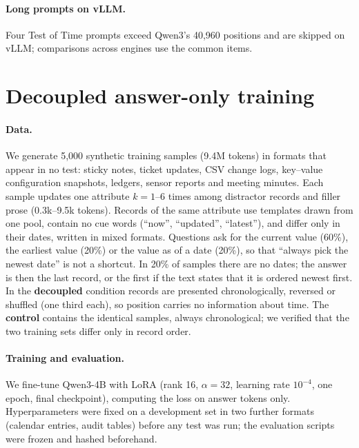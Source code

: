 \documentclass[11pt]{article}
\begin{document}
\paragraph{Long prompts on vLLM.} Four Test of Time prompts exceed Qwen3's 40{,}960 positions and are skipped on vLLM; comparisons across engines use the common items.

\section{Decoupled answer-only training}
\label{app:selection}

\paragraph{Data.}
We generate 5{,}000 synthetic training samples (9.4M tokens) in formats that appear in no test: sticky notes, ticket updates, CSV change logs, key--value configuration snapshots, ledgers, sensor reports and meeting minutes.
Each sample updates one attribute $k=1$--$6$ times among distractor records and filler prose (0.3k--9.5k tokens).
Records of the same attribute use templates drawn from one pool, contain no cue words (``now'', ``updated'', ``latest''), and differ only in their dates, written in mixed formats.
Questions ask for the current value (60\%), the earliest value (20\%) or the value as of a date (20\%), so that ``always pick the newest date'' is not a shortcut. In 20\% of samples there are no dates; the answer is then the last record, or the first if the text states that it is ordered newest first.
In the \textbf{decoupled} condition records are presented chronologically, reversed or shuffled (one third each), so position carries no information about time. The \textbf{control} contains the identical samples, always chronological; we verified that the two training sets differ only in record order.

\paragraph{Training and evaluation.}
We fine-tune Qwen3-4B with LoRA \citep{hu2022lora} (rank 16, $\alpha=32$, learning rate $10^{-4}$, one epoch, final checkpoint), computing the loss on answer tokens only.
Hyperparameters were fixed on a development set in two further formats (calendar entries, audit tables) before any test was run; the evaluation scripts were frozen and hashed beforehand.
\end{document}
